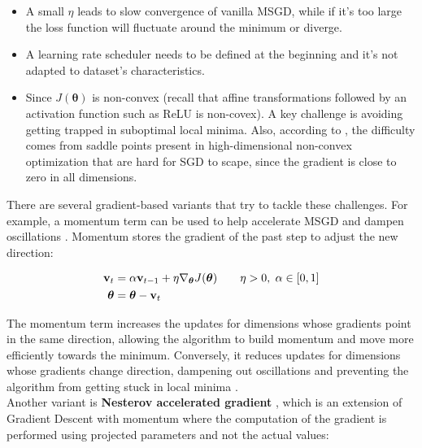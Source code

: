 \begin{itemize}
    \item A small $\eta$ leads to slow convergence of vanilla MSGD, while if it's too large the loss function will fluctuate around the minimum or diverge.\\
    \item A learning rate scheduler needs to be defined at the beginning and it's not adapted to dataset's characteristics.\\
    \item Since $J(\boldsymbol{\theta})$ is non-convex (recall that affine transformations followed by an activation function such as ReLU is non-covex). A key challenge is avoiding getting trapped in suboptimal local minima. Also, according to \cite{dauphin2014}, the difficulty comes from saddle points present in high-dimensional non-convex optimization that are hard for SGD to scape, since the gradient is close to zero in all dimensions.
\end{itemize}

There are several gradient-based variants that try to tackle these challenges. For example, a momentum term can be used to help accelerate MSGD and dampen oscillations \cite{qian1999}.
Momentum stores the gradient of the past step to adjust the new direction:

\begin{align}
    \label{eqn:SGD_momentum}
    \begin{split}
    \mathbf{v}_t &= \alpha \mathbf{v}_{t-1} + \eta \nabla_{\boldsymbol{\theta}} J(\boldsymbol{\theta}) \qquad \eta>0, \hspace*{.3 em} \alpha \in [0,1] \\
    \boldsymbol{\theta} &= \boldsymbol{\theta} - \mathbf{v}_t
    \end{split}
\end{align}

The momentum term increases the updates for dimensions whose gradients point in the same direction, allowing the algorithm to build momentum and move more efficiently towards the minimum. Conversely, it reduces updates for dimensions whose gradients change direction, dampening out oscillations and preventing the algorithm from getting stuck in local minima \cite{ruder2017}.\\

Another variant is \textbf{Nesterov accelerated gradient} \cite{y1983}, which is an extension of Gradient Descent with momentum where the computation of the gradient is performed using projected parameters and not the actual values:

